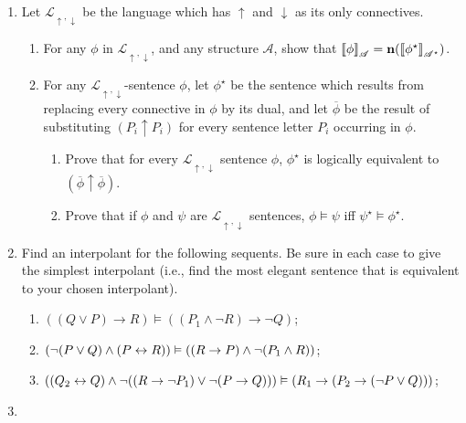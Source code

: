 {\begin{enumerate}
	\item Let $\mathcal{L}_{\uparrow,\downarrow}$ be the language which has $\uparrow$ and $\downarrow$ as its only connectives. \begin{enumerate}
		\item  For any $\phi$ in $\mathcal{L}_{\uparrow,\downarrow}$, and any structure $\mathscr{A}$, show that $\left\llbracket \phi\right\rrbracket_{\mathscr{A}} = \mathbf{n}(\left\llbracket \phi^{\star}\right\rrbracket_{\mathscr{A^{\star}}})$.	
	 \item For any $\mathcal{L}_{\uparrow,\downarrow}$-sentence $\phi$, let $\phi^{\star}$ be the sentence which results from replacing every connective in $\phi$ by its dual, and let $\overline{\phi}$ be the result of substituting $(P_{i}\uparrow P_{i})$ for every sentence letter $P_{i}$ occurring in $\phi$.	
	\begin{enumerate}
		\item Prove that for every $\mathcal{L}_{\uparrow,\downarrow}$ sentence $\phi$, $\phi^{\star}$ is logically equivalent to $(\overline{\phi}\uparrow\overline{\phi})$.
		\item Prove that if $\phi$ and $\psi$ are $\mathcal{L}_{\uparrow,\downarrow}$ sentences, $\phi \vDash \psi$ iff $\psi^{\star} \vDash \phi^{\star}$.
	\end{enumerate}\end{enumerate}


	\item Find an interpolant for the following sequents. Be sure in each case to give the simplest interpolant (i.e., find  the most elegant sentence that is equivalent to your chosen interpolant).\begin{enumerate}
		\item $((Q\vee P)\to R)\vDash ((P_{1}\wedge \neg R)\to\neg Q)$;
			\item $(\neg(P \vee Q)
		\wedge (P \leftrightarrow R)) \vDash ((R \to P) \wedge \neg (P_{1} \wedge R))$;
		 \item $((Q_{2} \leftrightarrow Q) \wedge
		    \neg ((R \to \neg P_{1}) \vee \neg (P \to Q))) \vDash
		    (R_{1} \to (P_{2} \to (\neg
		    P \vee Q)))$;
	\end{enumerate}
	




\item \begin{enumerate}


\end{enumerate}
\end{enumerate}}
